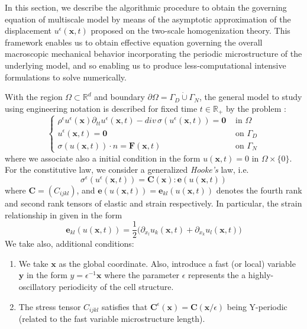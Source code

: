  In this section, we describe the algorithmic procedure to obtain the governing equation of multiscale model by means of the asymptotic approximation of the displacement $u^{\epsilon}(\mathbf{x},t)$ proposed on the two-scale homogenization theory. This framework enables us to obtain effective equation governing the overall macroscopic mechanical behavior incorporating the periodic microstructure of the underlying model, and so enabling us to produce less-computational intensive formulations to solve numerically.

With the region $\Omega \subset \mathbb{R}^d$ and boundary $\partial \Omega = \Gamma_D \dot\cup \Gamma_N$, the general model to study using engineering notation is described for fixed time $t \in \mathbb{R}_+$ by the problem :
\begin{equation}
    \label{VectorPDE-Elasticity}
    \left \{
    \begin{array}{cc}
        \rho^{\epsilon}u^{\epsilon}(\mathbf{x}) \partial_{tt} u^{\epsilon}(\mathbf{x},t) - div \, \sigma(u^{\epsilon}(\mathbf{x},t)) = \mathbf{0} & \text{ in } \Omega \\
        u^{\epsilon}(\mathbf{x}, t) = \mathbf{0} & \text{ on } \Gamma_D\\
        \sigma(u(\mathbf{x},t)) \cdot n = \mathbf{F}(\mathbf{x},t) & \text{ on } \Gamma_N
    \end{array}
    \right .
\end{equation}
where we associate also a initial condition in the form $u(\mathbf{x}, t) = 0 \text{ in } \Omega \times \{0\}$. For the constitutive law, we consider a generalized \textit{Hooke's} law, i.e.
\begin{equation}
    \label{ConstituteEq}
    \sigma^{\epsilon}(u^{\epsilon}(\mathbf{x}, t)) = \mathbf{C}(\mathbf{x}) : \mathbf{e}(u(\mathbf{x},t)) 
\end{equation}
where $\mathbf{C} = (C_{ijkl})$, and $\mathbf{e}(u(\mathbf{x},t)) = \mathbf{e}_{kl}(u(\mathbf{x},t))$ denotes the fourth rank and second rank tensors of elastic and strain respectively. In particular, the strain relationship in given in the form
\begin{equation}
    \label{StrainEq}
    \mathbf{e}_{kl} (u(\mathbf{x},t)) = \frac{1}{2}\big( \partial_{x_l} u_k(\mathbf{x},t) + \partial_{x_k} u_l (\mathbf{x},t) \big)
\end{equation}
We take also, additional conditions:
\begin{enumerate}
    \item We take $\mathbf{x}$ as the global coordinate. Also, introduce a fast (or local) variable $\mathbf{y}$ in the form $y = \epsilon^{-1}\mathbf{x}$ where the parameter $\epsilon$ represents the a highly-oscillatory periodicity of the cell structure.
    \item The stress tensor $C_{ijkl}$ satisfies that $\mathbf{C}^{\epsilon} (\mathbf{x}) = \mathbf{C}(\mathbf{x}/\epsilon)$ being Y-periodic (related to the fast variable microstructure length).
\end{enumerate}

